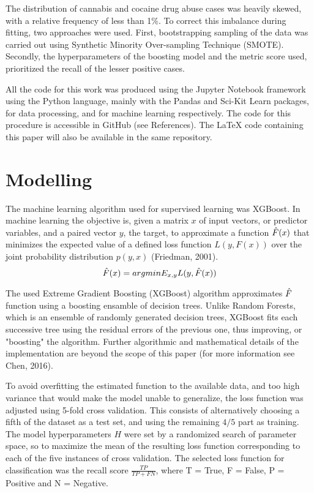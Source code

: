 \documentclass[8pt]{article}
\begin{document}
{\begin{multicols}{2}
The distribution of cannabis and cocaine drug abuse cases was heavily skewed, with a relative frequency of less than 1\%. To correct this imbalance during fitting, two approaches were used. First, bootstrapping sampling of the data was carried out using Synthetic Minority Over-sampling Technique (SMOTE). Secondly, the hyperparameters of the boosting model and the metric score used, prioritized the recall of the lesser positive cases.

All the code for this work was produced using the Jupyter Notebook framework using the Python language, mainly with the Pandas and Sci-Kit Learn packages, for data processing, and for machine learning respectively. The code for this procedure is accessible in GitHub (see References). The LaTeX code containing this paper will also be available in the same repository.


\section{Modelling}
The machine learning algorithm used for supervised learning was XGBoost. In machine learning the objective is, given a matrix $x$ of input vectors, or predictor variables, and a paired vector $y$, the target, to approximate a function $\Hat{F}(x)$ that minimizes the expected value of a defined loss function $L(y, F(x))$ over the joint probability distribution $p(y, x)$ (Friedman, 2001).
\begin{equation*}
\Hat{F}(x) = argmin E_{x, y}L(y, \Hat{F}(x))
\end{equation*}
 
The used Extreme Gradient Boosting (XGBoost) algorithm approximates $\Hat{F}$ function using a boosting ensamble of decision trees. Unlike Random Forests, which is an ensemble of randomly generated decision trees, XGBoost fits each successive tree using the residual errors of the previous one, thus improving, or "boosting" the algorithm. Further algorithmic and mathematical details of the implementation are beyond the scope of this paper (for more information see Chen, 2016).

To avoid overfitting the estimated function to the available data, and too high variance that would make the model unable to generalize, the loss function was adjusted using 5-fold cross validation. This consists of alternatively choosing a fifth of the dataset as a test set, and using the remaining $4/5$ part as training. The model hyperparameters $H$ were set by a randomized search of parameter space, so to maximize the mean of the resulting loss function corresponding to each of the five instances of cross validation. The selected loss function for classification was the recall score $\frac{TP}{TP + FN}$, where T = True, F = False, P = Positive and N = Negative. 


\end{multicols}}
\end{document}
